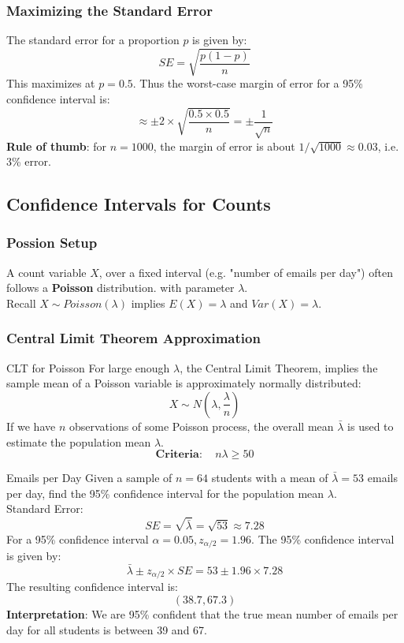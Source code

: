 \documentclass[10pt, total={6in, 8in}]{extarticle}
\begin{document}
\subsubsection{Maximizing the Standard Error}
The standard error for a proportion $p$ is given by:
$$SE = \sqrt{\frac{p(1 - p)}{n}}$$
This maximizes at $p = 0.5$. Thus the worst-case margin of error for a 95\% confidence interval is:
$$\approx \pm 2 \times \sqrt{\frac{0.5\times0.5}{n}} = \pm \frac{1}{\sqrt{n}}$$
\textbf{Rule of thumb}: for $n = 1000$, the margin of error is about $1/\sqrt{1000} \approx 0.03$, i.e. 3\% error.
\subsection{Confidence Intervals for Counts}
\subsubsection{Possion Setup}
A count variable $X$, over a fixed interval (e.g. "number of emails per day") often follows a \textbf{Poisson} distribution. with parameter $\lambda$.  \\
Recall $X \sim Poisson(\lambda)$ implies $E(X) = \lambda$ and $Var(X) = \lambda$.
\subsubsection{Central Limit Theorem Approximation}
\begin{definitionbox}{CLT for Poisson}{}
    For large enough $\lambda$, the Central Limit Theorem, implies the sample mean of a Poisson variable is approximately normally distributed:
    $$X \sim N\left(\lambda, \frac{\lambda}{n}\right)$$
    If we have $n$ observations of some Poisson process, the overall mean $\bar{\lambda}$ is used to estimate the population mean $\lambda$. \\[2ex]
    $$\textbf{Criteria}: \quad n\lambda \geq 50$$
\end{definitionbox}

\begin{examplebox}{Emails per Day}{}
    Given a sample of $n=64$ students with a mean of $\bar{\lambda} = 53$ emails per day, find the 95\% confidence interval for the population mean $\lambda$.\\[2ex]

    Standard Error:
    $$SE = \sqrt{\bar{\lambda}} = \sqrt{53} \approx 7.28$$
    For a 95\% confidence interval $\alpha = 0.05, z_{\alpha/2} = 1.96$.
    The 95\% confidence interval is given by:
    $$\bar{\lambda} \pm z_{\alpha/2} \times SE = 53 \pm 1.96 \times 7.28$$
    The resulting confidence interval is:
    $$(38.7, 67.3)$$
    \textbf{Interpretation}: We are 95\% confident that the true mean number of emails per day for all students is between 39 and 67.

\end{examplebox}
\end{document}

